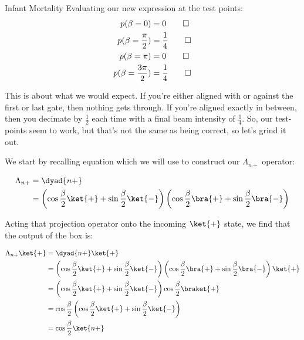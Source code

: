 \begin{answer}
\begin{answerpart}{Infant Mortality}
    Evaluating our new expression at the test points:
    \begin{equation}
      \begin{split}
        p(\beta=0) &= 0\qed\\
        p(\beta=\frac{\pi}{2}) &= \frac{1}{4}\qed\\
        p(\beta=\pi) &= 0\qed\\
        p(\beta=\frac{3\pi}{2}) &= \frac{1}{4}\qed\\
      \end{split}
    \end{equation}

    This is about what we would expect.  If you're either aligned with
    or against the first or last gate, then nothing gets through.  If
    you're aligned exactly in between, then you decimate by $\frac 1
    2$ each time with a final beam intensity of $\frac 1 4$. So, our
    test-points seem to work, but that's not the same as being
    correct, so let's grind it out.

    We start by recalling equation  which we will
    use to construct our $\Lambda_{n+}$ operator:

    \begin{equation}
      \begin{split}
        \Lambda_{n+}
        &= \dyad{n+}\\
        &= \left(\cos{\frac{\beta}{2}} \ket{+}
        + \sin{\frac{\beta}{2}} \ket{-}\right)
        \left(\cos{\frac{\beta}{2}} \bra{+}
        + \sin{\frac{\beta}{2}} \bra{-}\right)
      \end{split}
    \end{equation}

    Acting that projection operator onto the incoming $\ket{+}$
    state, we find that the output of the box is:

    \begin{equation}
      \begin{split}
        \Lambda_{n+} \ket{+}
        &= \dyad{n+}\ket{+}\\
        &= \left(\cos{\frac{\beta}{2}} \ket{+}
        + \sin{\frac{\beta}{2}} \ket{-}\right)
        \left(\cos{\frac{\beta}{2}} \bra{+}
        + \sin{\frac{\beta}{2}} \bra{-}\right)\ket{+}\\
        &= \left(\cos{\frac{\beta}{2}} \ket{+}
        + \sin{\frac{\beta}{2}} \ket{-}\right)
        \cos{\frac{\beta}{2}}\braket{+}\\
        &= \cos{\frac{\beta}{2}}\left(\cos{\frac{\beta}{2}} \ket{+}
        + \sin{\frac{\beta}{2}} \ket{-}\right)\\
        &= \cos{\frac{\beta}{2}}\ket{n+}
      \end{split}
    \end{equation}


\end{answerpart}
\end{answer}
